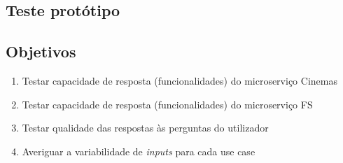 \documentclass[11pt, a4paper]{article}
\begin{document}
\newpage
\begin{appendices}

\section{Teste protótipo}

\subsection{Objetivos}
\begin{enumerate}
    \item Testar capacidade de resposta (funcionalidades) do microserviço Cinemas
    \item Testar capacidade de resposta (funcionalidades) do microserviço FS 
    \item Testar qualidade das respostas às perguntas do utilizador
    \item Averiguar a variabilidade de \textit{inputs} para cada use case
\end{enumerate}


\end{appendices}
\end{document}
